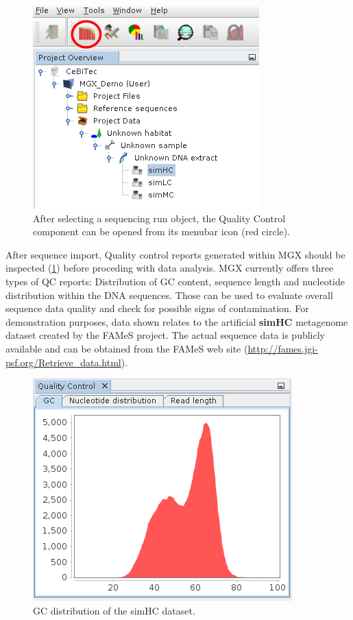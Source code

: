 \begin{figure}[H]
\centering
\includegraphics[width=.6\textwidth]{img/mgx/QCopen}
\caption[Quality control]{After selecting a sequencing run object, the Quality Control component can be opened
from its menubar icon (red circle).}
\label{qcopen}
\end{figure}

After sequence import, Quality control reports generated within MGX should be inspected (\ref{qcopen}) before proceding with data analysis.
MGX currently offers three types of QC reports: Distribution of GC content, sequence length
and nucleotide distribution within the DNA sequences. Those can be used to evaluate overall
sequence data quality and check for possible signs of contamination.
For demonstration purposes, data shown relates to the artificial \textbf{simHC} metagenome dataset created by the
FAMeS\cite{SIMMETA} project. The actual sequence data is publicly available and can be obtained from
the FAMeS web site (\url{http://fames.jgi-psf.org/Retrieve_data.html}).

\begin{figure}[H]
\centering
\includegraphics[width=.6\textwidth]{img/mgx/QCgc}
\caption[Quality control]{GC distribution of the simHC dataset.}
\label{qc1}
\end{figure}

